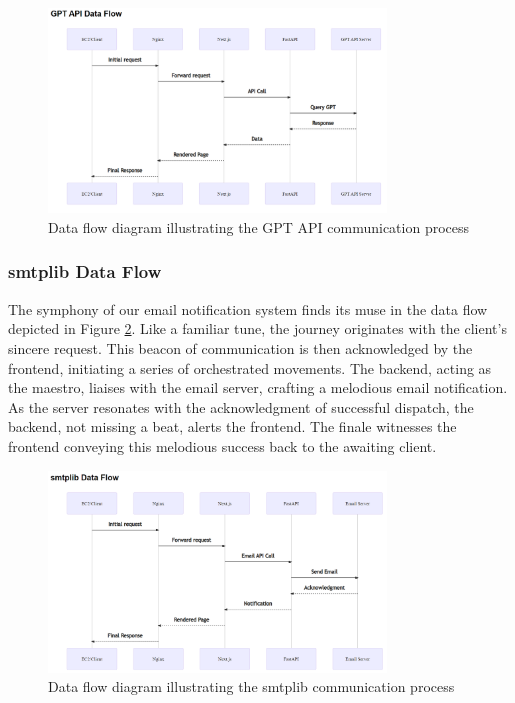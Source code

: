 \begin{figure}[ht]
	\centering
	\includegraphics[width=0.8\textwidth]{gpt_api_flow.png}
	\caption{Data flow diagram illustrating the GPT API communication process}
	\label{fig:gpt_api_flow}
\end{figure}

\subsubsection{smtplib Data Flow}

The symphony of our email notification system finds its muse in the data flow depicted in Figure \ref{fig:smtplib_flow}. Like a familiar tune, the journey originates with the client's sincere request. This beacon of communication is then acknowledged by the frontend, initiating a series of orchestrated movements. The backend, acting as the maestro, liaises with the email server, crafting a melodious email notification. As the server resonates with the acknowledgment of successful dispatch, the backend, not missing a beat, alerts the frontend. The finale witnesses the frontend conveying this melodious success back to the awaiting client.

\begin{figure}[ht]
	\centering
	\includegraphics[width=0.8\textwidth]{smtplib_flow.png}
	\caption{Data flow diagram illustrating the smtplib communication process}
	\label{fig:smtplib_flow}
\end{figure}

